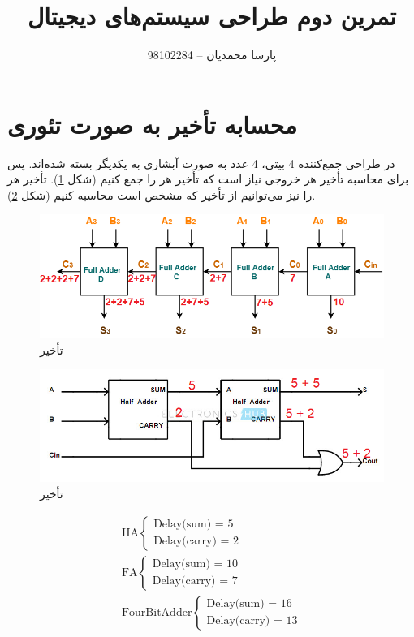 \documentclass{article}
\title{تمرین دوم طراحی سیستم‌های دیجیتال}
\author{پارسا محمدیان -- 98102284}
\begin{document}
\maketitle
\newpage
\section*{محسابه تأخیر به صورت تئوری}
در طراحی جمع‌کننده 4 بیتی، 4 عدد 
به صورت آبشاری به یکدیگر بسته شده‌اند. 
پس برای محاسبه تأخیر هر خروجی نیاز است که تأخیر هر 
را جمع کنیم (شکل \ref{FourBitAdderDelay}).
تأخیر هر 
را نیز می‌توانیم از تأخیر 
که مشخص است محاسبه کنیم (شکل \ref{FADelay}).

\begin{figure}[!htbp]
    \centering
    \includegraphics[width=\linewidth]{FourBitAdderDelay.png}
    \caption{تأخیر }
    \label{FourBitAdderDelay}
\end{figure}

\begin{figure}[!htbp]
    \centering
    \includegraphics[width=\linewidth]{FADelay.png}
    \caption{تأخیر }
    \label{FADelay}
\end{figure}

\begin{latin}
\begin{gather*}
    \text{HA}
    \begin{cases}
        \text{Delay(sum) = 5}\\
        \text{Delay(carry) = 2}
    \end{cases} \\
    \text{FA}
    \begin{cases}
        \text{Delay(sum) = 10}\\
        \text{Delay(carry) = 7}
    \end{cases} \\
    \text{FourBitAdder}
    \begin{cases}
        \text{Delay(sum) = 16}\\
        \text{Delay(carry) = 13}
    \end{cases}
\end{gather*}
\end{latin}
\end{document}
